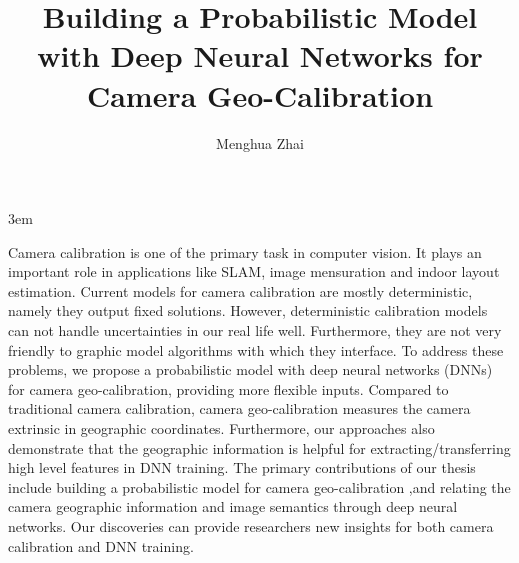 \documentclass[final]{ukthesis}
\begin{document}
\emergencystretch 3em

\author{Menghua Zhai}
\title{Building a Probabilistic Model with Deep Neural Networks for Camera Geo-Calibration}

\abstract
{ \SingleSpacing
Camera calibration is one of the primary task in computer vision.
It plays an important role in applications like SLAM, image
mensuration and indoor layout estimation. Current models for camera
calibration are mostly deterministic, namely they output fixed
solutions. 
However, deterministic calibration models can not handle uncertainties
in our real life well. Furthermore, they are not very friendly to
graphic model algorithms with which they interface.
To address these problems, we propose a probabilistic model with deep
neural networks (DNNs) for camera geo-calibration, providing more
flexible inputs. Compared to traditional camera calibration,
camera geo-calibration measures the camera extrinsic in geographic
coordinates.  Furthermore, our approaches also demonstrate that the
geographic information is helpful for extracting/transferring high
level features in DNN training.  The primary contributions of our
thesis include building a probabilistic model for camera
geo-calibration ,and relating the camera geographic information and
image semantics through deep neural networks. Our discoveries can
provide researchers new insights for both camera calibration and DNN
training.
}


\frontmatter
\maketitle



\tableofcontents\clearpage

\mainmatter




\backmatter




\end{document}

